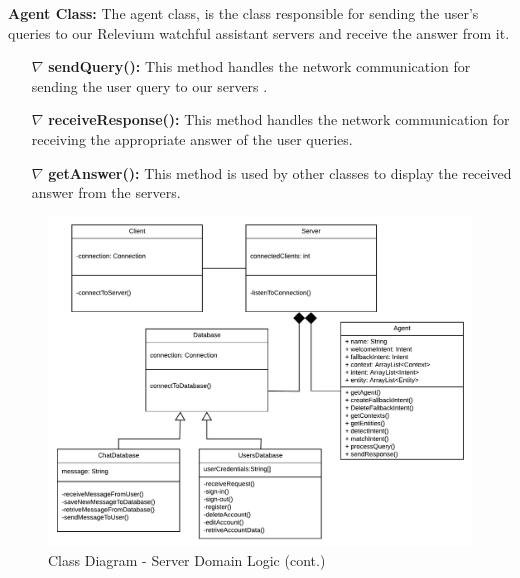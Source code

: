 \documentclass{scrreprt}
\begin{document}

\textbf{Agent Class:} The agent class, is the class responsible for sending the user's queries to our Relevium watchful assistant servers and receive the answer from it.
\begin{itemize}

	\item[$\nabla$] \textbf{sendQuery():} This method handles the network communication for sending the user query to our servers .
	\item[$\nabla$] \textbf{receiveResponse():} This method handles the network communication for receiving the appropriate answer of the user queries. 
	\item[$\nabla$] \textbf{getAnswer():} This method is used by other classes to display the received answer from the servers.
\end{itemize}


\clearpage

\begin{figure}[ht!]
    \includegraphics[angle=90, height=.95\textheight]{img3/ClassDiagramServerLogic.pdf}
    \caption{Class Diagram - Server Domain Logic (cont.)}
    \label{fig:classdiagram1}
\end{figure}
\end{document}
